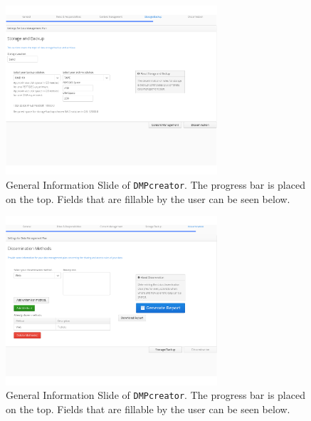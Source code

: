 \begin{figure}[]
	\centering
	\includegraphics[width=0.7\textwidth]{pictures/StorageBackup.png}
	\caption{General Information Slide of \texttt{DMPcreator}. The progress bar is placed on the top. Fields that are fillable by the user can be seen below.}
		\label{StorageBackupSlide}
\end{figure}

\begin{figure}[]
	\centering
	\label{Dissemination}
	\includegraphics[width=0.7\textwidth]{pictures/Dissemination.png}
	\caption{General Information Slide of \texttt{DMPcreator}. The progress bar is placed on the top. Fields that are fillable by the user can be seen below.}
\end{figure}